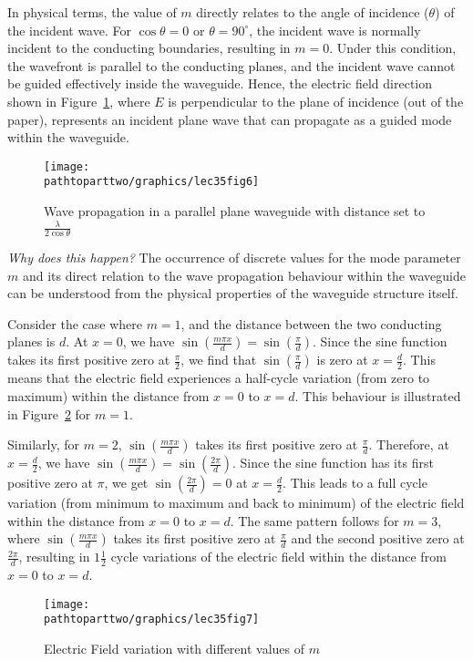 In physical terms, the value of $m$ directly relates to the angle of incidence ($\theta$) of the incident wave. For $\cos\theta=0$ or $\theta=90^\circ$, the incident wave is normally incident to the conducting boundaries, resulting in $m=0$. Under this condition, the wavefront is parallel to the conducting planes, and the incident wave cannot be guided effectively inside the waveguide. Hence, the electric field direction shown in Figure~\ref{fig:lec35fig6}, where $E$ is perpendicular to the plane of incidence (out of the paper), represents an incident plane wave that can propagate as a guided mode within the waveguide.
\begin{figure}[h]
\centering
\texttt{[image: \\pathtoparttwo/graphics/lec35fig6]}
\caption{Wave propagation in a parallel plane waveguide with distance set to $\frac{\lambda}{2\cos\theta}$}
\label{fig:lec35fig6}
\end{figure}

\emph{Why does this happen?} The occurrence of discrete values for the mode parameter $m$ and its direct relation to the wave propagation behaviour within the waveguide can be understood from the physical properties of the waveguide structure itself.

Consider the case where $m=1$, and the distance between the two conducting planes is $d$. At $x=0$, we have $\sin(\frac{m\pi x}{d}) = \sin(\frac{\pi}{d})$. Since the sine function takes its first positive zero at $\frac{\pi}{2}$, we find that $\sin(\frac{\pi}{d})$ is zero at $x=\frac{d}{2}$. This means that the electric field experiences a half-cycle variation (from zero to maximum) within the distance from $x=0$ to $x=d$. This behaviour is illustrated in Figure~\ref{fig:lec35fig7} for $m=1$.

Similarly, for $m=2$, $\sin(\frac{m\pi x}{d})$ takes its first positive zero at $\frac{\pi}{d}$. Therefore, at $x=\frac{d}{2}$, we have $\sin(\frac{m\pi x}{d}) = \sin(\frac{2\pi}{d})$. Since the sine function has its first positive zero at $\pi$, we get $\sin(\frac{2\pi}{d})=0$ at $x=\frac{d}{2}$. This leads to a full cycle variation (from minimum to maximum and back to minimum) of the electric field within the distance from $x=0$ to $x=d$. The same pattern follows for $m=3$, where $\sin(\frac{m\pi x}{d})$ takes its first positive zero at $\frac{\pi}{d}$ and the second positive zero at $\frac{2\pi}{d}$, resulting in $1\frac{1}{2}$ cycle variations of the electric field within the distance from $x=0$ to $x=d$.
\begin{figure}[h]
\centering
\texttt{[image: \\pathtoparttwo/graphics/lec35fig7]}
\caption{Electric Field variation with different values of $m$}
\label{fig:lec35fig7}
\end{figure}

